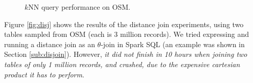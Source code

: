 \begin{figure}[!t]
	\centering
	 \vspace{4mm}


	\caption{$k$NN query performance on OSM.}\vspace{-4mm}
	\label{fig:knn}
\end{figure}



Figure \ref{fig:disj} shows the results of the distance join
experiments, using two tables sampled from OSM (each is 3 million
records). We tried expressing and running a distance join as an
$\theta$-join in Spark SQL (an example was shown in Section
\ref{sub:disjoin}). However, {\em it did not finish in 10 hours when
  joining two tables of only 1 million records, and crashed, due to
  the expensive cartesian product it has to perform}.


